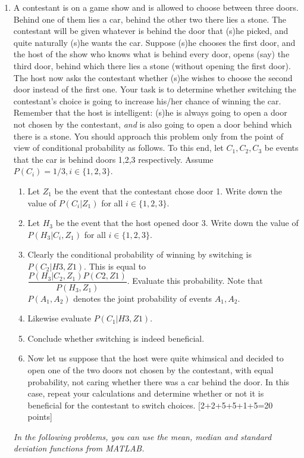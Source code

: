 \documentclass[11pt]{article}
\begin{document}
\begin{enumerate}
\item A contestant is on a game show and is allowed to choose between three doors. Behind one of them lies a car, behind the other two there lies a stone. The contestant will be given whatever is behind the door that (s)he picked, and quite naturally (s)he wants the car. Suppose (s)he chooses the first door, and the host of the show who knows what is behind every door, opens (say) the third door, behind which there lies a stone (without opening the first door). The host now asks the contestant whether (s)he wishes to choose the second door instead of the first one. Your task is to determine whether switching the contestant's choice is going to increase his/her chance of winning the car. Remember that the host is intelligent: (s)he is always going to open a door not chosen by the contestant, \emph{and} is also going to open a door behind which there is a stone. You should approach this problem only from the point of view of conditional probability as follows. To this end, let $C_1, C_2, C_3$ be events that the car is behind doors 1,2,3 respectively. Assume $P(C_i) = 1/3, i \in \{1,2,3\}$. 
\begin{enumerate}
\item Let $Z_1$ be the event that the contestant chose door 1. Write down the value of $P(C_i|Z_1)$ for all $i \in \{1,2,3\}$.
\item Let $H_3$ be the event that the host opened door 3. Write down the value of $P(H_3|C_i,Z_1)$ for all $i \in \{1,2,3\}$.
\item Clearly the conditional probability of winning by switching is $P(C_2|H3,Z1)$. This is equal to \\ $\dfrac{P(H_3|C_2,Z_1)P(C2,Z1)}{P(H_3,Z_1)}$. Evaluate this probability. Note that $P(A_1,A_2)$ denotes the joint probability of events $A_1, A_2$. 
\item Likewise evaluate $P(C_1|H3,Z1)$.
\item Conclude whether switching is indeed beneficial. 
\item Now let us suppose that the host were quite whimsical and decided to open one of the two doors not chosen by the contestant, with equal probability, not caring whether there was a car behind the door. In this case, repeat your calculations and determine whether or not it is beneficial for the contestant to switch choices. \textsf{[2+2+5+5+1+5=20 points]}
\end{enumerate}

\textit{In the following problems, you can use the mean, median and standard deviation functions from MATLAB.}


\end{enumerate}
\end{document}
